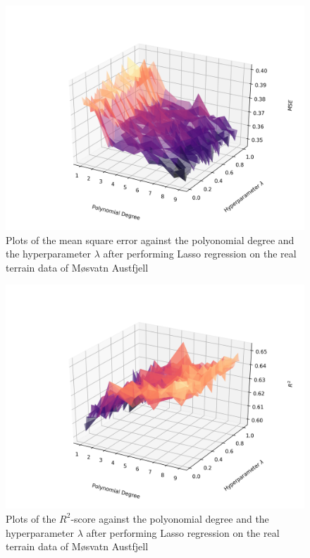 \documentclass[a4paper,10pt,english]{article}
\begin{document}
\begin{figure}[H]
	\centering 
	\includegraphics[scale=0.6]{../real_output/part_E_2.png}
	\caption{
		Plots of the mean square error against the polyonomial degree and the hyperparameter $\lambda$ after performing Lasso regression on the real terrain data of Møsvatn Austfjell 
	}
	\label{part_g_e2}
\end{figure}

\begin{figure}[H]
	\centering 
	\includegraphics[scale=0.6]{../real_output/part_E_3.png}
	\caption{
		Plots of the $R^2$-score against the polyonomial degree and the hyperparameter $\lambda$ after performing Lasso regression on the real terrain data of Møsvatn Austfjell
	}
	\label{part_g_e3}
\end{figure}
\end{document}
